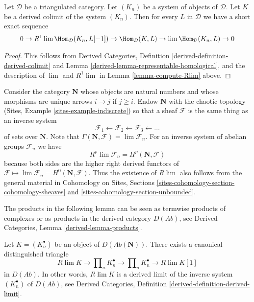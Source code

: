 \begin{lemma}
\label{lemma-map-from-hocolim}
Let $\mathcal{D}$ be a triangulated category. Let
$(K_n)$ be a system of objects of $\mathcal{D}$.
Let $K$ be a derived colimit of the system $(K_n)$.
Then for every $L$ in $\mathcal{D}$ we have a short exact sequence
$$
0 \to R^1\lim \Hom_\mathcal{D}(K_n, L[-1]) \to
\Hom_\mathcal{D}(K, L) \to
\lim \Hom_\mathcal{D}(K_n, L) \to 0
$$
\end{lemma}

\begin{proof}
This follows from
Derived Categories, Definition \ref{derived-definition-derived-colimit} and
Lemma \ref{derived-lemma-representable-homological},
and the description of $\lim$ and $R^1\lim$ in
Lemma \ref{lemma-compute-Rlim} above.
\end{proof}

\begin{remark}
\label{remark-Rlim-cohomology}
Consider the category $\mathbf{N}$ whose objects are natural numbers and
whose morphisms are unique arrows $i \to j$ if $j \geq i$. Endow $\mathbf{N}$
with the chaotic topology (Sites, Example \ref{sites-example-indiscrete}) so
that a sheaf $\mathcal{F}$ is the same thing as an inverse system
$$
\mathcal{F}_1 \leftarrow \mathcal{F}_2 \leftarrow \mathcal{F}_3
\leftarrow \ldots
$$
of sets over $\mathbf{N}$. Note that
$\Gamma(\mathbf{N}, \mathcal{F}) = \lim \mathcal{F}_n$. For an inverse
system of abelian groups $\mathcal{F}_n$ we have
$$
R^p\lim \mathcal{F}_n = H^p(\mathbf{N}, \mathcal{F})
$$
because both sides are the higher right derived functors of
$\mathcal{F} \mapsto \lim \mathcal{F}_n = H^0(\mathbf{N}, \mathcal{F})$.
Thus the existence of $R\lim$ also follows from the general material in
Cohomology on Sites, Sections
\ref{sites-cohomology-section-cohomology-sheaves} and
\ref{sites-cohomology-section-unbounded}.
\end{remark}

\noindent
The products in the following lemma can be seen as termwise products
of complexes or as products in the derived category $D(\textit{Ab})$, see
Derived Categories, Lemma \ref{derived-lemma-products}.

\begin{lemma}
\label{lemma-distinguished-triangle-Rlim}
Let $K = (K_n^\bullet)$ be an object of $D(\textit{Ab}(\mathbf{N}))$.
There exists a canonical distinguished triangle
$$
R\lim K \to \prod\nolimits_n K_n^\bullet \to \prod\nolimits_n K_n^\bullet
\to R\lim K[1]
$$
in $D(\textit{Ab})$. In other words, $R\lim K$ is a derived limit
of the inverse system $(K_n^\bullet)$ of $D(\textit{Ab})$, see
Derived Categories, Definition \ref{derived-definition-derived-limit}.
\end{lemma}

